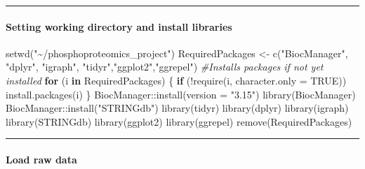 \documentclass[
]{article}
\newenvironment{Shaded}{\begin{snugshade}}{\end{snugshade}}
\newcommand{\AttributeTok}[1]{\textcolor[rgb]{0.77,0.63,0.00}{#1}}
\newcommand{\CommentTok}[1]{\textcolor[rgb]{0.56,0.35,0.01}{\textit{#1}}}
\newcommand{\ConstantTok}[1]{\textcolor[rgb]{0.00,0.00,0.00}{#1}}
\newcommand{\ControlFlowTok}[1]{\textcolor[rgb]{0.13,0.29,0.53}{\textbf{#1}}}
\newcommand{\FunctionTok}[1]{\textcolor[rgb]{0.00,0.00,0.00}{#1}}
\newcommand{\NormalTok}[1]{#1}
\newcommand{\OtherTok}[1]{\textcolor[rgb]{0.56,0.35,0.01}{#1}}
\newcommand{\SpecialCharTok}[1]{\textcolor[rgb]{0.00,0.00,0.00}{#1}}
\newcommand{\StringTok}[1]{\textcolor[rgb]{0.31,0.60,0.02}{#1}}
\begin{document}
\begin{center}\rule{0.5\linewidth}{0.5pt}\end{center}

\hypertarget{setting-working-directory-and-install-libraries}{%
\paragraph{Setting working directory and install
libraries}\label{setting-working-directory-and-install-libraries}}

\begin{Shaded}
\begin{Highlighting}[]
\FunctionTok{setwd}\NormalTok{(}\StringTok{"\textasciitilde{}/phosphoproteomics\_project"}\NormalTok{)}
\NormalTok{RequiredPackages }\OtherTok{\textless{}{-}} \FunctionTok{c}\NormalTok{(}\StringTok{"BiocManager"}\NormalTok{, }\StringTok{"dplyr"}\NormalTok{, }\StringTok{"igraph"}\NormalTok{, }\StringTok{"tidyr"}\NormalTok{,}\StringTok{"ggplot2"}\NormalTok{,}\StringTok{"ggrepel"}\NormalTok{) }
\CommentTok{\#Installs packages if not yet installed}
\ControlFlowTok{for}\NormalTok{ (i }\ControlFlowTok{in}\NormalTok{ RequiredPackages) \{ }
    \ControlFlowTok{if}\NormalTok{ (}\SpecialCharTok{!}\FunctionTok{require}\NormalTok{(i, }\AttributeTok{character.only =} \ConstantTok{TRUE}\NormalTok{)) }
    \FunctionTok{install.packages}\NormalTok{(i)}
\NormalTok{\}}
\NormalTok{BiocManager}\SpecialCharTok{::}\FunctionTok{install}\NormalTok{(}\AttributeTok{version =} \StringTok{"3.15"}\NormalTok{)}
\FunctionTok{library}\NormalTok{(BiocManager)}
\NormalTok{BiocManager}\SpecialCharTok{::}\FunctionTok{install}\NormalTok{(}\StringTok{"STRINGdb"}\NormalTok{)}
\FunctionTok{library}\NormalTok{(tidyr)}
\FunctionTok{library}\NormalTok{(dplyr)}
\FunctionTok{library}\NormalTok{(igraph)}
\FunctionTok{library}\NormalTok{(STRINGdb)}
\FunctionTok{library}\NormalTok{(ggplot2)}
\FunctionTok{library}\NormalTok{(ggrepel)}
\FunctionTok{remove}\NormalTok{(RequiredPackages)}
\end{Highlighting}
\end{Shaded}

\begin{center}\rule{0.5\linewidth}{0.5pt}\end{center}

\hypertarget{load-raw-data}{%
\paragraph{Load raw data}\label{load-raw-data}}
\end{document}
